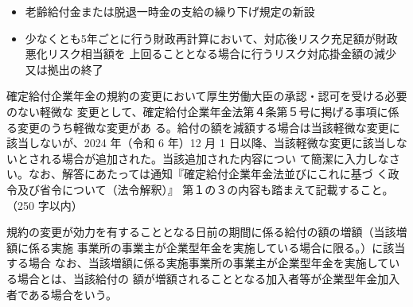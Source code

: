 \begin{answerbox}
 \begin{itemize}
  \item 老齢給付金または脱退一時金の支給の繰り下げ規定の新設
  \item 少なくとも5年ごとに行う財政再計算において、対応後リスク充足額が財政悪化リスク相当額を
    上回ることとなる場合に行うリスク対応掛金額の減少又は拠出の終了
 \end{itemize}
\end{answerbox}

\begin{shortanswer}[年金1 \ 2024 \ 問題2(1)ウ]
確定給付企業年金の規約の変更において厚生労働大臣の承認・認可を受ける必要のない軽微な
変更として、確定給付企業年金法第４条第５号に掲げる事項に係る変更のうち軽微な変更があ
る。給付の額を減額する場合は当該軽微な変更に該当しないが、2024 年（令和 6 年）12 月 1
日以降、当該軽微な変更に該当しないとされる場合が追加された。当該追加された内容につい
て簡潔に入力しなさい。なお、解答にあたっては通知『確定給付企業年金法並びにこれに基づ
く政令及び省令について（法令解釈）』 第１の３の内容も踏まえて記載すること。 （250 字以内）
\end{shortanswer}


\begin{answerbox}
規約の変更が効力を有することとなる日前の期間に係る給付の額の増額（当該増額に係る実施
事業所の事業主が企業型年金を実施している場合に限る。）に該当する場合
なお、当該増額に係る実施事業所の事業主が企業型年金を実施している場合とは、当該給付の
額が増額されることとなる加入者等が企業型年金加入者である場合をいう。
\end{answerbox}


